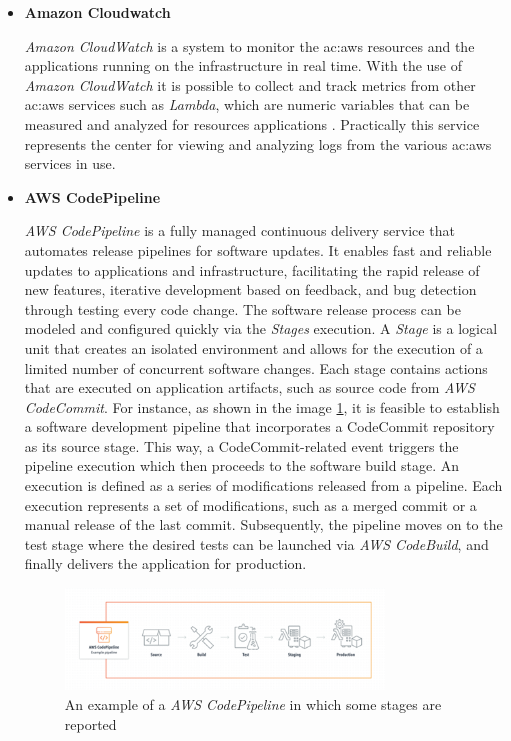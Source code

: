 \begin{itemize}
    \item[] \textbf{Amazon Cloudwatch}
    
    \textit{Amazon CloudWatch} is a system to monitor the \gls{ac:aws} resources and the applications running on the infrastructure in real time. With the use of \textit{Amazon CloudWatch} it is possible to collect and track metrics from other \gls{ac:aws} services such as \textit{Lambda}, which are numeric variables that can be measured and analyzed for resources applications \cite{AWSCloudwatch}. Practically this service represents the center for viewing and analyzing logs from the various \gls{ac:aws} services in use.

    \item[] \textbf{AWS CodePipeline}
    
    \textit{AWS CodePipeline} is a fully managed continuous delivery service that automates release pipelines for software updates. It enables fast and reliable updates to applications and infrastructure, facilitating the rapid release of new features, iterative development based on feedback, and bug detection through testing every code change. The software release process can be modeled and configured quickly via the \textit{Stages} execution. A \textit{Stage} is a logical unit that creates an isolated environment and allows for the execution of a limited number of concurrent software changes. Each stage contains actions that are executed on application artifacts, such as source code from \textit{AWS CodeCommit}. For instance, as shown in the image \ref{fig:AWSCodePipeline}, it is feasible to establish a software development pipeline that incorporates a CodeCommit repository as its source stage. This way, a CodeCommit-related event triggers the pipeline execution which then proceeds to the software build stage. An execution is defined as a series of modifications released from a pipeline. Each execution represents a set of modifications, such as a merged commit or a manual release of the last commit. Subsequently, the pipeline moves on to the test stage where the desired tests can be launched via \textit{AWS CodeBuild}, and finally delivers the application for production. 
    \begin{figure}[h]  %
        \centering
        \includegraphics[width=0.8\textwidth]{images/AWSCodePipeline.png}  %
        \caption{An example of a \textit{AWS CodePipeline} in which some stages are reported \cite{AWSCodepipeline}}
        \label{fig:AWSCodePipeline}
    \end{figure}
    

\end{itemize}
